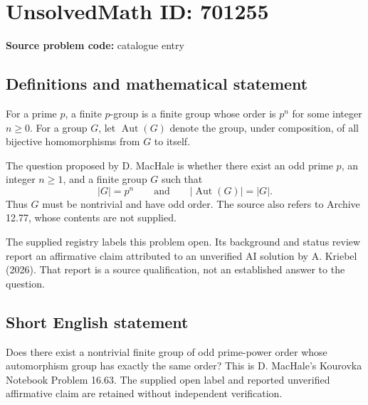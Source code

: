 \documentclass[11pt]{article}
\begin{document}
\section*{UnsolvedMath ID: 701255}
\textbf{Source problem code:} catalogue entry
\subsection{Definitions and mathematical statement}
For a prime \(p\), a finite \(p\)-group is a finite group whose order is \(p^n\) for some integer \(n\geq 0\). For a group \(G\), let \(\operatorname{Aut}(G)\) denote the group, under composition, of all bijective homomorphisms from \(G\) to itself.

The question proposed by D. MacHale is whether there exist an odd prime \(p\), an integer \(n\geq 1\), and a finite group \(G\) such that
\[
|G|=p^n
\qquad\text{and}\qquad
|\operatorname{Aut}(G)|=|G|.
\]
Thus \(G\) must be nontrivial and have odd order. The source also refers to Archive 12.77, whose contents are not supplied.

The supplied registry labels this problem open. Its background and status review report an affirmative claim attributed to an unverified AI solution by A. Kriebel (2026). That report is a source qualification, not an established answer to the question.
\subsection{Short English statement}
Does there exist a nontrivial finite group of odd prime-power order whose automorphism group has exactly the same order? This is D. MacHale's Kourovka Notebook Problem 16.63. The supplied open label and reported unverified affirmative claim are retained without independent verification.
\end{document}
